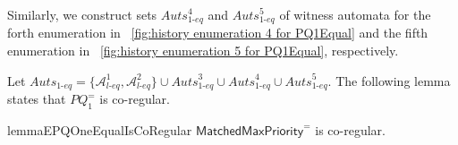 Similarly, we construct sets $\textit{Auts}_{\textit{1-eq}}^{4}$ and $\textit{Auts}_{\textit{1-eq}}^{5}$ of witness automata for the forth enumeration in \figurename~\ref{fig:history enumeration 4 for PQ1Equal} and the fifth enumeration in \figurename~\ref{fig:history enumeration 5 for PQ1Equal}, respectively.

Let $\textit{Auts}_{\textit{1-eq}} = \{ \mathcal{A}_{\textit{l-eq}}^1, \mathcal{A}_{\textit{l-eq}}^2 \} \cup \textit{Auts}_{\textit{1-eq}}^{3} \cup \textit{Auts}_{\textit{1-eq}}^{4} \cup \textit{Auts}_{\textit{1-eq}}^{5}$. The following lemma states that $\textit{PQ}_1^{=}$ is co-regular.


\begin{restatable}{lemma}{EPQOneEqualIsCoRegular}
\label{lemma:EPQ1Equal is co-regular}
$\mathsf{MatchedMaxPriority}^{=}$ is co-regular.
\end{restatable}


